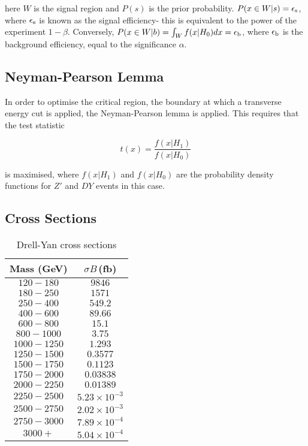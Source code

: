 here $W$ is the signal region and $P(s)$ is the prior probability. $P(x\in W|s) = \epsilon_{\rm{s}}$, where $\epsilon_{\rm{s}}$ is known as the signal efficiency- this is equivalent to the power of the experiment $1-\beta$. Conversely, $P(x \in W|b) =  \int_{W}f(x|H_0)dx = \epsilon_{\rm{b}}$, where $\epsilon_{\rm{b}}$ is the background efficiency, equal to the significance $\alpha$.

\subsection{Neyman-Pearson Lemma}
In order to optimise the critical region, the boundary at which a transverse energy cut is applied, the Neyman-Pearson lemma \cite{NeymanPearsonLemma} is applied. This requires that the test statistic

\begin{equation}
t(x) = \frac{f(x|H_1)}{f(x|H_0)}
\end{equation}

is maximised, where $f(x|H_1)$ and $f(x|H_0)$ are the probability density functions for $Z'$ and $DY$ events in this case.

\subsection{Cross Sections}

\begin{table}[h!t]
\label{table:DYXS}
\centering
\caption{ Drell-Yan cross sections }
\begin{tabular}{ |c|c| } 
\hline
Mass (GeV) & $\sigma B\,$(fb)\\\hline
$120-180$ & $9846$ \\\hline
$180-250$ & $1571$\\\hline
$250-400$ & $549.2$\\\hline
$400-600$ & $89.66$\\\hline
$600-800$ & $15.1$\\\hline
$800-1000$ & $3.75$\\\hline
$1000-1250$ & $1.293$\\\hline
$1250-1500$ & $0.3577$\\\hline
$1500-1750$ & $0.1123$\\\hline
$1750-2000$ & $0.03838$\\\hline
$2000-2250$ & $0.01389$\\\hline
$2250-2500$ & $5.23\times10^{-3}$\\\hline
$2500-2750$ & $2.02\times10^{-3}$\\\hline
$2750-3000$ & $7.89\times10^{-4}$\\\hline
$3000+$ & $5.04\times10^{-4}$\\\hline
\end{tabular}
\end{table}

